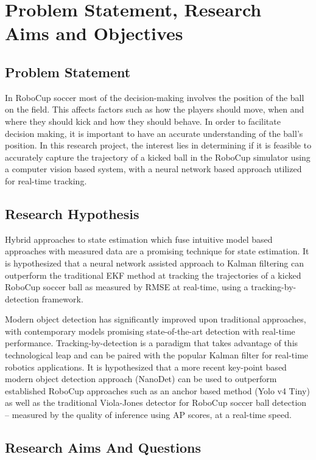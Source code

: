 \documentclass[a4paper,twoside,12pt]{report}
\begin{document}
\chapter{Problem Statement, Research Aims and Objectives}
\section{Problem Statement}

In RoboCup soccer most of the decision-making involves the position of the ball on the field. This affects factors such as how the players should move, when and where they should kick and how they should behave. In order to facilitate decision making, it is important to have an accurate understanding of the ball’s position. In this research project, the interest lies in determining if it is feasible to accurately capture the trajectory of a kicked ball in the RoboCup simulator using a computer vision based system, with a neural network based approach utilized for real-time tracking.

\section{Research Hypothesis}

Hybrid approaches to state estimation which fuse intuitive model based approaches with measured data are a promising technique for state estimation. It is hypothesized that a neural network assisted approach to Kalman filtering can outperform the traditional EKF method at tracking the trajectories of a kicked RoboCup soccer ball as measured by RMSE at real-time, using a tracking-by-detection framework.

Modern object detection has significantly improved upon traditional approaches, with contemporary models promising state-of-the-art detection with real-time performance. Tracking-by-detection is a paradigm that takes advantage of this technological leap and can be paired with the popular Kalman filter for real-time robotics applications. It is hypothesized that a more recent key-point based modern object detection approach (NanoDet) can be used to outperform established RoboCup approaches such as an anchor based method (Yolo v4 Tiny) as well as the traditional Viola-Jones detector for RoboCup soccer ball detection -- measured by the quality of inference using AP scores, at a real-time speed. 

\section{Research Aims And Questions}
\end{document}
